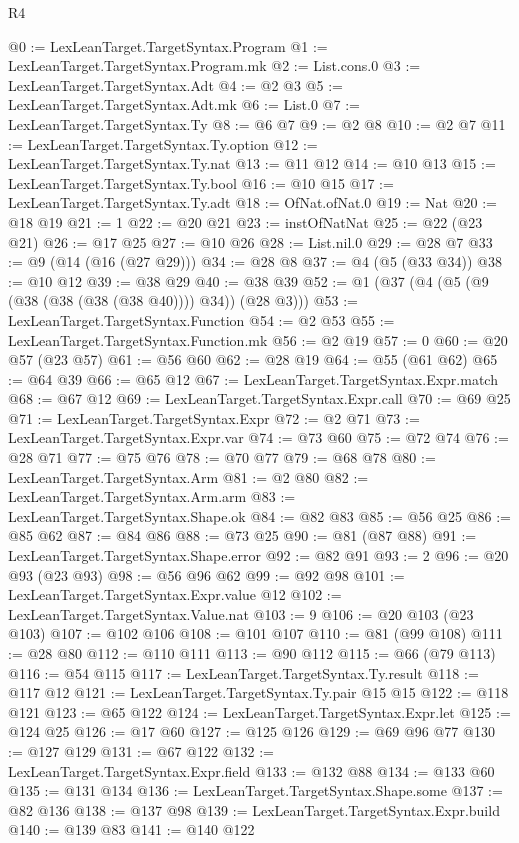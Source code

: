 \begin{lexlean}{R4}
\begin{coremodule}
@0 := LexLeanTarget.TargetSyntax.Program
@1 := LexLeanTarget.TargetSyntax.Program.mk
@2 := List.cons.{0}
@3 := LexLeanTarget.TargetSyntax.Adt
@4 := @2 @3
@5 := LexLeanTarget.TargetSyntax.Adt.mk
@6 := List.{0}
@7 := LexLeanTarget.TargetSyntax.Ty
@8 := @6 @7
@9 := @2 @8
@10 := @2 @7
@11 := LexLeanTarget.TargetSyntax.Ty.option
@12 := LexLeanTarget.TargetSyntax.Ty.nat
@13 := @11 @12
@14 := @10 @13
@15 := LexLeanTarget.TargetSyntax.Ty.bool
@16 := @10 @15
@17 := LexLeanTarget.TargetSyntax.Ty.adt
@18 := OfNat.ofNat.{0}
@19 := Nat
@20 := @18 @19
@21 := 1
@22 := @20 @21
@23 := instOfNatNat
@25 := @22 (@23 @21)
@26 := @17 @25
@27 := @10 @26
@28 := List.nil.{0}
@29 := @28 @7
@33 := @9 (@14 (@16 (@27 @29)))
@34 := @28 @8
@37 := @4 (@5 (@33 @34))
@38 := @10 @12
@39 := @38 @29
@40 := @38 @39
@52 := @1 (@37 (@4 (@5 (@9 (@38 (@38 (@38 (@38 @40)))) @34)) (@28 @3)))
@53 := LexLeanTarget.TargetSyntax.Function
@54 := @2 @53
@55 := LexLeanTarget.TargetSyntax.Function.mk
@56 := @2 @19
@57 := 0
@60 := @20 @57 (@23 @57)
@61 := @56 @60
@62 := @28 @19
@64 := @55 (@61 @62)
@65 := @64 @39
@66 := @65 @12
@67 := LexLeanTarget.TargetSyntax.Expr.match
@68 := @67 @12
@69 := LexLeanTarget.TargetSyntax.Expr.call
@70 := @69 @25
@71 := LexLeanTarget.TargetSyntax.Expr
@72 := @2 @71
@73 := LexLeanTarget.TargetSyntax.Expr.var
@74 := @73 @60
@75 := @72 @74
@76 := @28 @71
@77 := @75 @76
@78 := @70 @77
@79 := @68 @78
@80 := LexLeanTarget.TargetSyntax.Arm
@81 := @2 @80
@82 := LexLeanTarget.TargetSyntax.Arm.arm
@83 := LexLeanTarget.TargetSyntax.Shape.ok
@84 := @82 @83
@85 := @56 @25
@86 := @85 @62
@87 := @84 @86
@88 := @73 @25
@90 := @81 (@87 @88)
@91 := LexLeanTarget.TargetSyntax.Shape.error
@92 := @82 @91
@93 := 2
@96 := @20 @93 (@23 @93)
@98 := @56 @96 @62
@99 := @92 @98
@101 := LexLeanTarget.TargetSyntax.Expr.value @12
@102 := LexLeanTarget.TargetSyntax.Value.nat
@103 := 9
@106 := @20 @103 (@23 @103)
@107 := @102 @106
@108 := @101 @107
@110 := @81 (@99 @108)
@111 := @28 @80
@112 := @110 @111
@113 := @90 @112
@115 := @66 (@79 @113)
@116 := @54 @115
@117 := LexLeanTarget.TargetSyntax.Ty.result
@118 := @117 @12
@121 := LexLeanTarget.TargetSyntax.Ty.pair @15 @15
@122 := @118 @121
@123 := @65 @122
@124 := LexLeanTarget.TargetSyntax.Expr.let
@125 := @124 @25
@126 := @17 @60
@127 := @125 @126
@129 := @69 @96 @77
@130 := @127 @129
@131 := @67 @122
@132 := LexLeanTarget.TargetSyntax.Expr.field
@133 := @132 @88
@134 := @133 @60
@135 := @131 @134
@136 := LexLeanTarget.TargetSyntax.Shape.some
@137 := @82 @136
@138 := @137 @98
@139 := LexLeanTarget.TargetSyntax.Expr.build
@140 := @139 @83
@141 := @140 @122

\end{coremodule}
\end{lexlean}
